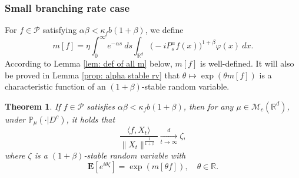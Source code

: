 \documentclass[12pt,a4paper]{amsart}
\theoremstyle{plain}
\newtheorem{thm}{Theorem}[section]
\theoremstyle{definition}
\numberwithin{equation}{section}
\begin{document}
\subsubsection{Small branching rate case}
\label{msmallcase}
	For $f\in \mathcal{P}$ satisfying $\alpha\beta<\kappa_f b(1+\beta)$, we define
\begin{equation}
    m[f]
    =\eta \int_0^{\infty} e^{-\alpha s} ~ds\int_{\mathbb R^d} \big(-iP_s^\alpha f(x)\big)^{1+\beta} \varphi(x)~dx.
\end{equation}
	According to Lemma \ref{lem: def of all m} below, $m[f]$ is well-defined.
	It will also be proved in Lemma \ref{prop: alpha stable rv} that $\theta \mapsto \exp(\theta m[f])$ is a characteristic function of an $(1+\beta)$-stable random variable.
\begin{thm}
\label{thm: small clt}
    If $f\in\mathcal{P}$ satisfies $\alpha\beta<\kappa_f b(1+\beta)$, then for any $\mu\in \mathcal M_c(\mathbb R^d)$, under $\mathbb{P}_{\mu}(\cdot|D^c)$, it holds that
\[
    \frac{\langle f,X_t\rangle}{\|X_t\|^{\frac{1}{1+\beta}}}\xrightarrow[t\rightarrow \infty]{d} \zeta,
\]
    where $\zeta$ is a $(1+\beta)$-stable random variable with
\[
    \mathbf E[e^{i\theta \zeta}]
    =\exp(m[\theta f]), 
    \quad \theta\in \mathbb R.
\]
\end{thm}
\end{document}
